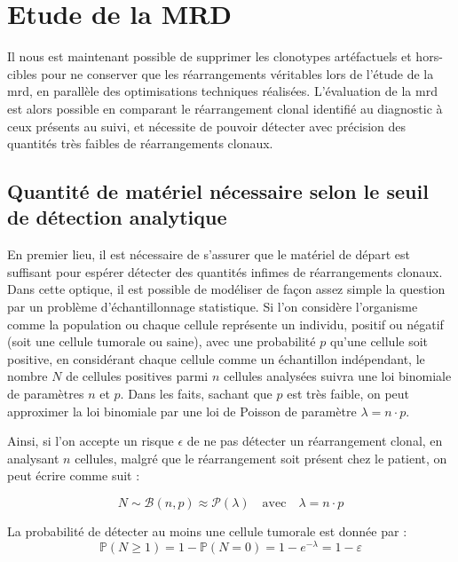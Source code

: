 \section{Etude de la MRD}

Il nous est maintenant possible de supprimer les clonotypes artéfactuels et
hors-cibles pour ne conserver que les réarrangements véritables lors de l'étude
de la \gls{mrd}, en parallèle des optimisations techniques réalisées.
L'évaluation de la \gls{mrd} est alors possible en comparant le réarrangement
clonal identifié au diagnostic à ceux présents au suivi, et nécessite de
pouvoir détecter avec précision des quantités très faibles de réarrangements
clonaux.

\subsection{Quantité de matériel nécessaire selon le seuil de détection analytique}

En premier lieu, il est nécessaire de s'assurer que le matériel de départ est
suffisant pour espérer détecter des quantités infimes de réarrangements
clonaux. Dans cette optique, il est possible de modéliser de façon assez simple
la question par un problème d'échantillonnage statistique. Si l'on considère
l'organisme comme la population ou chaque cellule représente un individu,
positif ou négatif (soit une cellule tumorale ou saine), avec une probabilité
$p$ qu'une cellule soit positive, en considérant chaque cellule comme un
échantillon indépendant, le nombre $N$ de cellules positives parmi $n$ cellules
analysées suivra une loi binomiale de paramètres $n$ et $p$. Dans les faits,
sachant que $p$ est très faible, on peut approximer la loi binomiale par une
loi de Poisson de paramètre $\lambda = n \cdot p$.

Ainsi, si l'on accepte un risque $\epsilon$ de ne pas détecter un réarrangement
clonal, en analysant $n$ cellules, malgré que le réarrangement soit présent
chez le patient, on peut écrire comme suit :

\begin{equation}
    N \sim \mathcal{B}(n, p) \approx \mathcal{P}(\lambda)
    \quad \text{avec} \quad \lambda = n \cdot p
\end{equation}

La probabilité de détecter au moins une cellule tumorale est donnée par :
\begin{equation}
    \mathbb{P}(N \geq 1) = 1 - \mathbb{P}(N = 0) = 1 - e^{-\lambda} = 1 - \varepsilon
\end{equation}

